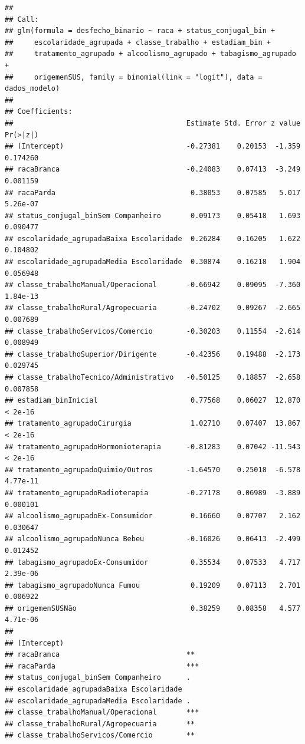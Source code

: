 \documentclass[
]{article}
\begin{document}
\begin{verbatim}
## 
## Call:
## glm(formula = desfecho_binario ~ raca + status_conjugal_bin + 
##     escolaridade_agrupada + classe_trabalho + estadiam_bin + 
##     tratamento_agrupado + alcoolismo_agrupado + tabagismo_agrupado + 
##     origemenSUS, family = binomial(link = "logit"), data = dados_modelo)
## 
## Coefficients:
##                                         Estimate Std. Error z value Pr(>|z|)
## (Intercept)                             -0.27381    0.20153  -1.359 0.174260
## racaBranca                              -0.24083    0.07413  -3.249 0.001159
## racaParda                                0.38053    0.07585   5.017 5.26e-07
## status_conjugal_binSem Companheiro       0.09173    0.05418   1.693 0.090477
## escolaridade_agrupadaBaixa Escolaridade  0.26284    0.16205   1.622 0.104802
## escolaridade_agrupadaMedia Escolaridade  0.30874    0.16218   1.904 0.056948
## classe_trabalhoManual/Operacional       -0.66942    0.09095  -7.360 1.84e-13
## classe_trabalhoRural/Agropecuaria       -0.24702    0.09267  -2.665 0.007689
## classe_trabalhoServicos/Comercio        -0.30203    0.11554  -2.614 0.008949
## classe_trabalhoSuperior/Dirigente       -0.42356    0.19488  -2.173 0.029745
## classe_trabalhoTecnico/Administrativo   -0.50125    0.18857  -2.658 0.007858
## estadiam_binInicial                      0.77568    0.06027  12.870  < 2e-16
## tratamento_agrupadoCirurgia              1.02710    0.07407  13.867  < 2e-16
## tratamento_agrupadoHormonioterapia      -0.81283    0.07042 -11.543  < 2e-16
## tratamento_agrupadoQuimio/Outros        -1.64570    0.25018  -6.578 4.77e-11
## tratamento_agrupadoRadioterapia         -0.27178    0.06989  -3.889 0.000101
## alcoolismo_agrupadoEx-Consumidor         0.16660    0.07707   2.162 0.030647
## alcoolismo_agrupadoNunca Bebeu          -0.16026    0.06413  -2.499 0.012452
## tabagismo_agrupadoEx-Consumidor          0.35534    0.07533   4.717 2.39e-06
## tabagismo_agrupadoNunca Fumou            0.19209    0.07113   2.701 0.006922
## origemenSUSNão                           0.38259    0.08358   4.577 4.71e-06
##                                            
## (Intercept)                                
## racaBranca                              ** 
## racaParda                               ***
## status_conjugal_binSem Companheiro      .  
## escolaridade_agrupadaBaixa Escolaridade    
## escolaridade_agrupadaMedia Escolaridade .  
## classe_trabalhoManual/Operacional       ***
## classe_trabalhoRural/Agropecuaria       ** 
## classe_trabalhoServicos/Comercio        ** 

\end{verbatim}
\end{document}
